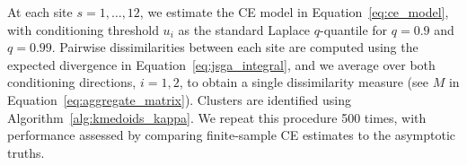 \documentclass[12pt,compact]{article}
\newcommand{\JSGa}{\mathop{\mathrm{JS}^{\mathrm{G}_{\lambda}}}\nolimits}
\begin{document}
At each site $s = 1, \ldots, 12$, we estimate the CE model in Equation~\eqref{eq:ce_model}, with conditioning threshold $u_{i}$ as the standard Laplace $q$-quantile for \(q=0.9\) and \(q=0.99\).
Pairwise dissimilarities between each site are computed using the expected divergence in Equation~\eqref{eq:jsga_integral}, and we average over both conditioning directions, $i = 1, 2$, to obtain a single dissimilarity measure (see $M$ in Equation~\eqref{eq:aggregate_matrix}).
Clusters are identified using Algorithm~\ref{alg:kmedoids_kappa}.
We repeat this procedure 500 times, with performance assessed by comparing finite-sample CE estimates to the asymptotic truths. 
\end{document}
